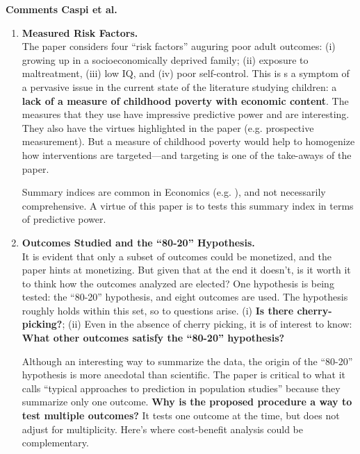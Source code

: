 



\doublespacing

\noindent \textbf{Comments Caspi et al.}\\

\noindent

\begin{enumerate}

\item \textbf{Measured Risk Factors.}\\
\noindent The paper considers four ``risk factors'' auguring poor adult outcomes: (i) growing up in a socioeconomically deprived family; (ii) exposure to maltreatment, (iii) low IQ, and (iv) poor self-control. This is s a symptom of a pervasive issue in the current state of the literature studying children: a \textbf{lack of a measure of childhood poverty with economic content}. The measures that they use have impressive predictive power and are interesting. They also have the virtues highlighted in the paper (e.g. prospective measurement). But a measure of childhood poverty would help to homogenize how interventions are targeted---and targeting is one of the take-aways of the paper.

\noindent Summary indices are common in Economics (e.g. \citet{Kline_Walters_2016_QJE}), and not necessarily comprehensive. A virtue of this paper is to tests this summary index in terms of predictive power.\\

\item \textbf{Outcomes Studied and the ``80-20'' Hypothesis.}\\
\noindent It is evident that only a subset of outcomes could be monetized, and the paper hints at monetizing. But given that at the end it doesn't, is it worth it to think how the outcomes analyzed are elected? One hypothesis is being tested: the ``80-20'' hypothesis, and eight outcomes are used. The hypothesis roughly holds within this set, so to questions arise. (i) \textbf{Is there cherry-picking?}; (ii) Even in the absence of cherry picking, it is of interest to know: \textbf{What other outcomes satisfy the ``80-20'' hypothesis?}

\noindent Although an interesting way to summarize the data, the origin of the ``80-20'' hypothesis is more anecdotal than scientific. The paper is critical to what it calls ``typical approaches to prediction in population studies'' because they summarize only one outcome. \textbf{Why is the proposed procedure a way to test multiple outcomes?} It tests one outcome at the time, but does not adjust for multiplicity. Here's where cost-benefit analysis could be complementary. 


\end{enumerate}
